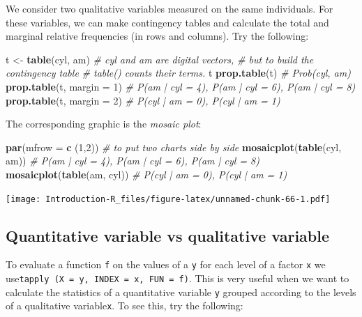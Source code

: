 \documentclass[]{book}
\newenvironment{Shaded}{\begin{snugshade}}{\end{snugshade}}
\newcommand{\CommentTok}[1]{\textcolor[rgb]{0.56,0.35,0.01}{\textit{#1}}}
\newcommand{\DataTypeTok}[1]{\textcolor[rgb]{0.13,0.29,0.53}{#1}}
\newcommand{\DecValTok}[1]{\textcolor[rgb]{0.00,0.00,0.81}{#1}}
\newcommand{\KeywordTok}[1]{\textcolor[rgb]{0.13,0.29,0.53}{\textbf{#1}}}
\newcommand{\NormalTok}[1]{#1}
\newcommand{\StringTok}[1]{\textcolor[rgb]{0.31,0.60,0.02}{#1}}
\begin{document}
We consider two qualitative variables measured on the same individuals. For these variables, we can make contingency tables and calculate the total and marginal relative frequencies (in rows and columns). Try the following:

\begin{Shaded}
\begin{Highlighting}[]
\NormalTok{t <-}\StringTok{ }\KeywordTok{table}\NormalTok{(cyl, am)}
\CommentTok{# cyl and am are digital vectors,}
\CommentTok{# but to build the contingency table}
\CommentTok{# table() counts their terms.}
\NormalTok{t}
\KeywordTok{prop.table}\NormalTok{(t) }\CommentTok{# Prob(cyl, am)}
\KeywordTok{prop.table}\NormalTok{(t, }\DataTypeTok{margin =} \DecValTok{1}\NormalTok{) }\CommentTok{# P(am | cyl = 4), P(am | cyl = 6), P(am | cyl = 8)}
\KeywordTok{prop.table}\NormalTok{(t, }\DataTypeTok{margin =} \DecValTok{2}\NormalTok{) }\CommentTok{# P(cyl | am = 0), P(cyl | am = 1)}
\end{Highlighting}
\end{Shaded}

The corresponding graphic is the \emph{mosaic plot}:

\begin{Shaded}
\begin{Highlighting}[]
\KeywordTok{par}\NormalTok{(}\DataTypeTok{mfrow =} \KeywordTok{c}\NormalTok{ (}\DecValTok{1}\NormalTok{,}\DecValTok{2}\NormalTok{)) }\CommentTok{# to put two charts side by side}
\KeywordTok{mosaicplot}\NormalTok{(}\KeywordTok{table}\NormalTok{(cyl, am)) }\CommentTok{# P(am | cyl = 4), P(am | cyl = 6), P(am | cyl = 8)}
\KeywordTok{mosaicplot}\NormalTok{(}\KeywordTok{table}\NormalTok{(am, cyl)) }\CommentTok{# P(cyl | am = 0), P(cyl | am = 1)}
\end{Highlighting}
\end{Shaded}

\texttt{[image: Introduction-R\_files/figure-latex/unnamed-chunk-66-1.pdf]}

\hypertarget{quantitative-variable-vs-qualitative-variable}{%
\subsection{Quantitative variable vs qualitative variable}\label{quantitative-variable-vs-qualitative-variable}}

To evaluate a function \texttt{f} on the values of a \texttt{y} for each level of a factor \texttt{x} we use\texttt{tapply\ (X\ =\ y,\ INDEX\ =\ x,\ FUN\ =\ f)}. This is very useful when we want to calculate the statistics of a quantitative variable \texttt{y} grouped according to the levels of a qualitative variable\texttt{x}. To see this, try the following:
\end{document}
